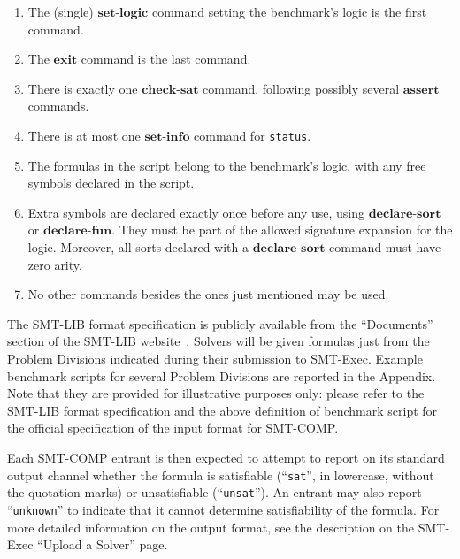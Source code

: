 \documentclass[12pt]{article}
\newcommand{\akey}[1]{\textbf{#1}}
\begin{document}
\begin{enumerate}
\item The (single) $\akey{set-logic}$ command setting the benchmark's
logic is the first command.
\item The $\akey{exit}$ command is the last command.
\item There is exactly one $\akey{check-sat}$ command,
following possibly several $\akey{assert}$ commands.
\item There is at most one $\akey{set-info}$ command for \texttt{status}.
\item The formulas in the script belong to the benchmark's logic, with
any free symbols declared in the script.
\item Extra symbols are declared exactly once before any
  use, using $\akey{declare-sort}$
  or $\akey{declare-fun}$.
  They must be part of the allowed signature expansion for the logic.
  Moreover, all sorts declared with a $\akey{declare-sort}$ command must have zero arity.
\item No other commands besides the ones just mentioned may be used.
\end{enumerate}

\noindent The SMT-LIB format specification is publicly
available from the ``Documents'' section of the SMT-LIB
website~\cite{SMT-LIB}.  Solvers will be given formulas just from the
Problem Divisions indicated during their submission to SMT-Exec.
Example benchmark scripts for several Problem Divisions are reported in the Appendix.
Note that they are provided for illustrative purposes only: 
please refer to the SMT-LIB format specification 
and the above definition of benchmark script for the official specification 
of the input format for SMT-COMP.

\medskip
Each SMT-COMP entrant is then expected to attempt to report on its
standard output channel whether the formula is satisfiable
(``\texttt{sat}'', in lowercase, without the quotation marks) or unsatisfiable
(``\texttt{unsat}'').  An entrant may also report ``\texttt{unknown}''
to indicate that it cannot determine satisfiability of the formula.
For more detailed information on the output format, see the
description on the SMT-Exec ``Upload a Solver'' page.
\end{document}
